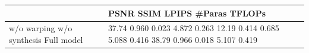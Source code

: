 \begin{tabular}{ll}
\toprule
 & PSNR SSIM LPIPS \#Paras TFLOPs \\
\midrule
w/o warping w/o synthesis Full model & 37.74 0.960 0.023 4.872 0.263 12.19 0.414 0.685 5.088 0.416 38.79 0.966 0.018 5.107 0.419 \\
\bottomrule
\end{tabular}
